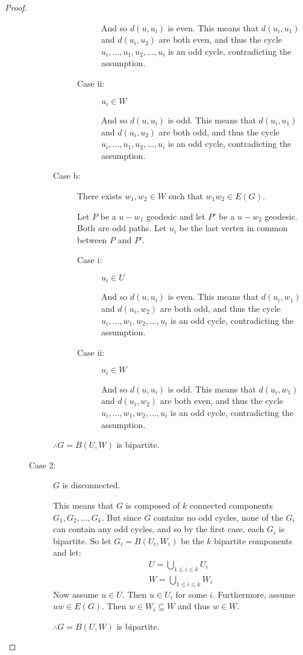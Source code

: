 \documentclass[letterpaper,12pt,fleqn]{article}
\begin{document}
\begin{proof}
\begin{description}
\begin{description}
\begin{description}
\begin{description}
          And so \(d(u,u_i)\) is even.  This means that \(d(u_i,u_1)\) and \(d(u_i,u_2)\) are both even, and thus the
          cycle \(u_i,\ldots,u_1,u_2,\ldots,u_i\) is an odd cycle, contradicting the assumption.

        \item[Case ii:] \(u_i\in W\)

          And so \(d(u,u_i)\) is odd.  This means that \(d(u_i,u_1)\) and \(d(u_i,u_2)\) are both odd, and thus the
          cycle \(u_i,\ldots,u_1,u_2,\ldots,u_i\) is an odd cycle, contradicting the assumption.
        \end{description}

      \item[Case b:] There exists \(w_1,w_2\in W\) such that \(w_1w_2\in E(G)\).

        Let \(P\) be a \(u-w_1\) geodesic and let \(P'\) be a \(u-w_2\) geodesic.  Both are odd paths.  Let \(u_i\)
        be the last vertex in common between \(P\) and \(P'\).
        \begin{description}
        \item[Case i:] \(u_i\in U\)

          And so \(d(u,u_i)\) is even.  This means that \(d(u_i,w_1)\) and \(d(u_i,w_2)\) are both odd, and thus the
          cycle \(u_i,\ldots,w_1,w_2,\ldots,u_i\) is an odd cycle, contradicting the assumption.

        \item[Case ii:] \(u_i\in W\)

          And so \(d(u,u_i)\) is odd.  This means that \(d(u_i,w_1)\) and \(d(u_i,w_2)\) are both even, and thus the
          cycle \(u_i,\ldots,w_1,w_2,\ldots,u_i\) is an odd cycle, contradicting the assumption.
        \end{description}
      \end{description}

      \(\therefore G=B(U,W)\) is bipartite.

    \item[Case 2:] \(G\) is disconnected.

      This means that \(G\) is composed of \(k\) connected components \(G_1,G_2,\ldots,G_k\).  But since \(G\)
      contains no odd cycles, none of the \(G_i\) can contain any odd cycles, and so by the first case, each
      \(G_i\) is bipartite.  So let \(G_i=B(U_i,W_i)\) be the \(k\) bipartite components and let:
      \begin{gather*}
        U=\bigcup_{1\le i\le k}U_i \\
        W=\bigcup_{1\le i\le k}W_i
      \end{gather*}
      Now assume \(u\in U\).  Then \(u\in U_i\) for some \(i\).  Furthermore, assume \(uw\in E(G)\).  Then
      \(w\in W_i\subseteq W\) and thus \(w\in W\).

      \(\therefore G=B(U,W)\) is bipartite.
    \end{description}
  \end{description}
\end{proof}
\end{document}
